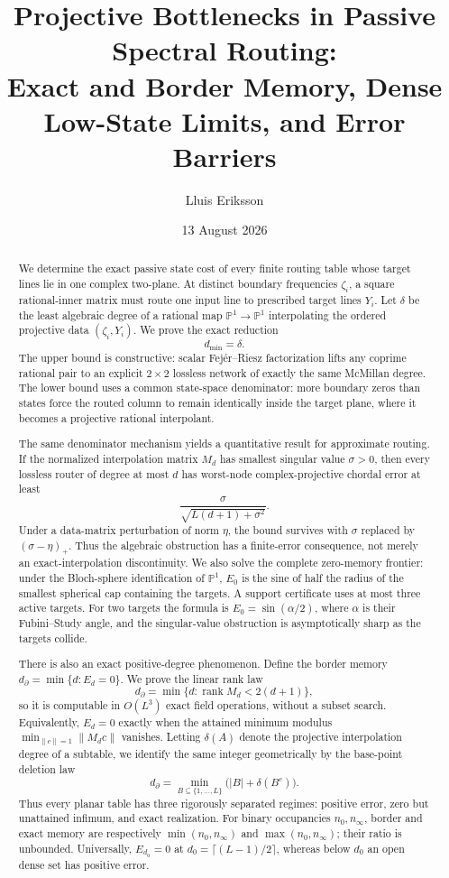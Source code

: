 \documentclass[11pt]{article}
\title{Projective Bottlenecks in Passive Spectral Routing:\\
Exact and Border Memory, Dense Low-State Limits, and Error Barriers}
\author{Lluis Eriksson}
\date{13 August 2026}
\theoremstyle{definition}\newtheorem{definition}[theorem]{Definition}\newtheorem{example}[theorem]{Example}
\theoremstyle{remark}\newtheorem{remark}[theorem]{Remark}\newtheorem{limitation}[theorem]{Limitation}
\newcommand{\PP}{\mathbb P}\newcommand{\rank}{\operatorname{rank}}
\begin{document}
\maketitle

\begin{abstract}
We determine the exact passive state cost of every finite routing table whose
target lines lie in one complex two-plane.  At distinct boundary frequencies
$\zeta_i$, a square rational-inner matrix must route one input line to prescribed
target lines $Y_i$.  Let $\delta$ be the least algebraic degree of a rational
map $\PP^1\to\PP^1$ interpolating the ordered projective data
$(\zeta_i,Y_i)$.  We prove the exact reduction
\[
                         d_{\min}=\delta.
\]
The upper bound is constructive: scalar Fej\'er--Riesz factorization lifts any
coprime rational pair to an explicit $2\times2$ lossless network of exactly the
same McMillan degree.  The lower bound uses a common state-space denominator:
more boundary zeros than states force the routed column to remain identically
inside the target plane, where it becomes a projective rational interpolant.

The same denominator mechanism yields a quantitative result for approximate
routing.  If the normalized interpolation matrix $M_d$ has smallest singular
value $\sigma>0$, then every lossless router of degree at most $d$ has
worst-node complex-projective chordal error at least
\[
                 \frac{\sigma}{\sqrt{L(d+1)+\sigma^2}}.
\]
Under a data-matrix perturbation of norm $\eta$, the bound survives with
$\sigma$ replaced by $(\sigma-\eta)_+$.  Thus the algebraic obstruction has a
finite-error consequence, not merely an exact-interpolation discontinuity.
We also solve the complete zero-memory frontier: under the Bloch-sphere
identification of $\PP^1$, $E_0$ is the sine of half the radius of the smallest
spherical cap containing the targets.  A support certificate uses at most three
active targets.  For two targets the formula is $E_0=\sin(\alpha/2)$, where
$\alpha$ is their Fubini--Study angle, and the singular-value obstruction is
asymptotically sharp as the targets collide.

There is also an exact positive-degree phenomenon.  Define the border memory
$d_\partial=\min\{d:E_d=0\}$.  We prove the linear rank law
\[
 d_\partial=\min\{d:\rank M_d<2(d+1)\},
 \]
so it is computable in $O(L^3)$ exact field operations, without a
subset search.  Equivalently, $E_d=0$ exactly when the attained minimum modulus
$\min_{\|c\|=1}\|M_dc\|$ vanishes.  Letting $\delta(A)$ denote the projective
interpolation degree of a subtable, we identify the same integer geometrically
by the base-point deletion law
\[
 d_\partial=\min_{B\subseteq\{1,\ldots,L\}}
                 \bigl(|B|+\delta(B^c)\bigr).
\]
Thus every planar table has three rigorously separated regimes: positive error,
zero but unattained infimum, and exact realization.  For binary occupancies
$n_0,n_\infty$, border and exact memory are respectively
$\min(n_0,n_\infty)$ and $\max(n_0,n_\infty)$; their ratio is unbounded.
Universally, $E_{d_0}=0$ at $d_0=\lceil(L-1)/2\rceil$, whereas below $d_0$ an
open dense set has positive error.


\end{abstract}
\end{document}
